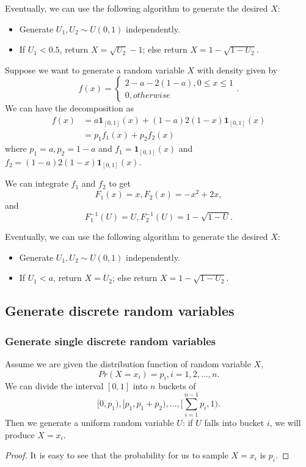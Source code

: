\begin{refsection}
\begin{example}
Eventually, we can use the following algorithm to generate the desired $X$:
\begin{itemize}
	\item Generate $U_1,U_2 \sim U(0,1)$ independently.
	\item If $U_1<0.5$, return $X = \sqrt{U_2}-1$; else return $X = 1-\sqrt{1-U_2}$.
\end{itemize}

\end{example}


\begin{example}
	Suppose we want to generate a random variable $X$ with density given by
	$$f(x) = \begin{cases*}
	2-a-2(1-a), 0\leq x \leq 1\\
	0, otherwise
	\end{cases*}.$$	
	We can have the decomposition as
	\begin{align*}
	f(x) &= a \bm{1}_{[0,1]}(x) + (1-a)2(1-x)\bm{1}_{[0,1]}(x) \\
	&= p_1f_1(x) + p_2f_2(x)
	\end{align*}
	where $p_1=a,p_2=1-a$ and $f_1 = \bm{1}_{[0,1]}(x)$ and $f_2=(1-a)2(1-x)\bm{1}_{[0,1]}(x)$.
	
	We can integrate $f_1$ and $f_2$ to get
	$$F_1(x) = x, F_2(x) = -x^2+2x,$$
	and
	$$F_1^{-1}(U)=U, F_2^{-1}(U) = 1 - \sqrt{1-U}.$$
	
	Eventually, we can use the following algorithm to generate the desired $X$:
	\begin{itemize}
		\item Generate $U_1,U_2 \sim U(0,1)$ independently.
		\item If $U_1<a$, return $X = U_2$; else return $X = 1-\sqrt{1-U_2}$.
	\end{itemize}
	
\end{example}


\subsection{Generate discrete random variables}


\subsubsection{Generate single discrete random variables}

\begin{lemma}
	Assume we are given the  distribution function of random variable $X$,
	$$Pr(X=x_i) = p_{i}, i=1,2,...,n.$$
	We can divide the interval $[0,1]$ into $n$ buckets of
	$$[0,p_1),[p_1,p_1+p_2),...,[\sum_{i=1}^{n-1} p_i,1).$$
	Then we generate a uniform random variable $U$: if $U$ falls into bucket $i$, we will produce $X = x_i$.
\end{lemma}
\begin{proof}
It is easy to see that the probability for us to sample $X=x_i$ is $p_i$.
\end{proof}


\end{refsection}
